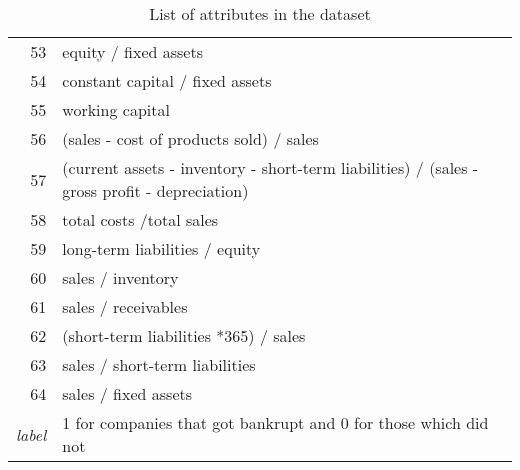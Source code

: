\begin{table*}
\begin{tabular}[t]{|r|p{6cm}| }
    53	&	equity / fixed assets \\
    54	&	constant capital / fixed assets \\
    55	&	working capital \\
    56	&	(sales - cost of products sold) / sales \\
    57	&	(current assets - inventory - short-term liabilities) / (sales - gross profit - depreciation) \\
    58	&	total costs /total sales \\
    59	&	long-term liabilities / equity \\
    60	&	sales / inventory \\
    61	&	sales / receivables \\
    62	&	(short-term liabilities *365) / sales \\
    63	&	sales / short-term liabilities \\
    64	&	sales / fixed assets \\
     \hline
    \textit{label} & 1 for companies that got bankrupt and 0 for those which did not \\
    \hline
\end{tabular}

\caption{\label{tab::dataset_attr_desc} List of attributes in the dataset}
\end{table*}